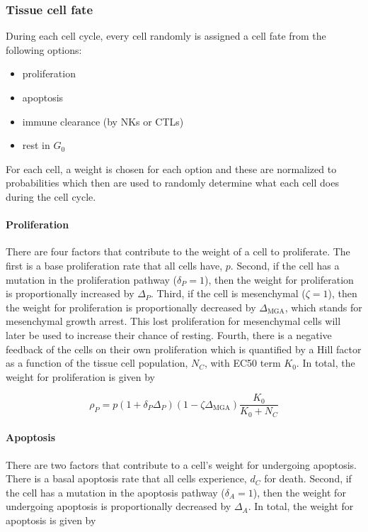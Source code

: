 \documentclass[11pt]{article}
\begin{document}
\subsubsection{Tissue cell fate}
During each cell cycle, every cell randomly is assigned a cell fate from the following options:
\begin{itemize}
\item proliferation
\item apoptosis
\item immune clearance (by NKs or CTLs)
\item rest in $G_0$
\end{itemize}

For each cell, a weight is chosen for each option and these are normalized to probabilities which then are used to randomly determine what each cell does during the cell cycle.

\paragraph{Proliferation}
There are four factors that contribute to the weight of a cell to proliferate.
The first is a base proliferation rate that all cells have, $p$.
Second, if the cell has a mutation in the proliferation pathway ($\delta_P=1$), then the weight for proliferation is proportionally increased by $\Delta_P$.
Third, if the cell is mesenchymal ($\zeta=1$), then the weight for proliferation is proportionally decreased by $\Delta_{\text{MGA}}$, which stands for mesenchymal growth arrest.
This lost proliferation for mesenchymal cells will later be used to increase their chance of resting.
Fourth, there is a negative feedback of the cells on their own proliferation which is quantified by a Hill factor as a function of the tissue cell population, $N_C$, with EC50 term $K_0$.
In total, the weight for proliferation is given by

\begin{equation}\tag{2.1}
\rho_P = p(1+\delta_{P}\Delta_P)(1-\zeta \Delta_{\text{MGA}})\frac{K_0}{K_0+N_C}
\end{equation}

\paragraph{Apoptosis}
There are two factors that contribute to a cell's weight for undergoing apoptosis.
There is a basal apoptosis rate that all cells experience, $d_C$ for death.
Second, if the cell has a mutation in the apoptosis pathway ($\delta_A=1$), then the weight for undergoing apoptosis is proportionally decreased by $\Delta_A$.
In total, the weight for apoptosis is given by 
\end{document}
